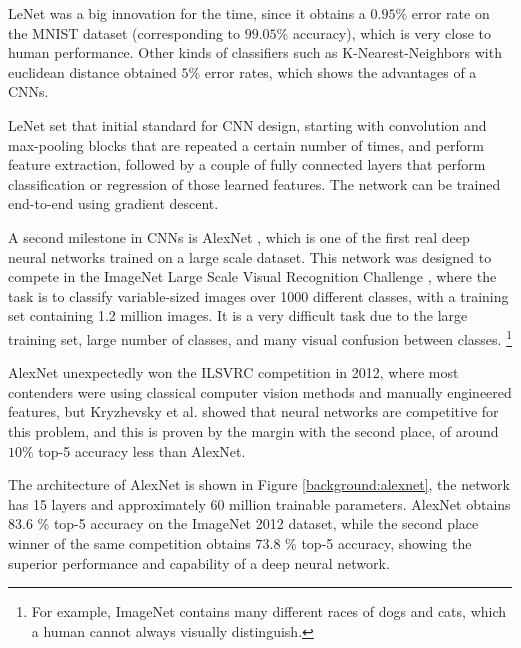 LeNet was a big innovation for the time, since it obtains a $0.95 \%$ error rate on the MNIST dataset (corresponding to $99.05 \%$ accuracy), which is very close to human performance. Other kinds of classifiers such as K-Nearest-Neighbors with euclidean distance obtained $5 \%$ error rates, which shows the advantages of a CNNs.

LeNet set that initial standard for CNN design, starting with convolution and max-pooling blocks that are repeated a certain number of times, and perform feature extraction, followed by a couple of fully connected layers that perform classification or regression of those learned features. The network can be trained end-to-end using gradient descent.

A second milestone in CNNs is AlexNet \cite[-5em]{krizhevsky2012imagenet}, which is one of the first real deep neural networks trained on a large scale dataset. This network was designed to compete in the ImageNet Large Scale Visual Recognition Challenge \cite[-2em]{russakovsky2015imagenet}, where the task is to classify variable-sized images over 1000 different classes, with a training set containing 1.2 million images. It is a very difficult task due to the large training set, large number of classes, and many visual confusion between classes. \footnote[][2em]{For example, ImageNet contains many different races of dogs and cats, which a human cannot always visually distinguish.}

AlexNet unexpectedly won the ILSVRC competition in 2012, where most contenders were using classical computer vision methods and manually engineered features, but Kryzhevsky et al. showed that neural networks are competitive for this problem, and this is proven by the margin with the second place, of around $10 \%$ top-5 accuracy less than AlexNet.

The architecture of AlexNet is shown in Figure \ref{background:alexnet}, the network has 15 layers and approximately 60 million trainable parameters. AlexNet obtains $83.6$ \% top-5 accuracy on the ImageNet 2012 dataset, while the second place winner of the same competition obtains $73.8$ \% top-5 accuracy, showing the superior performance and capability of a deep neural network.

